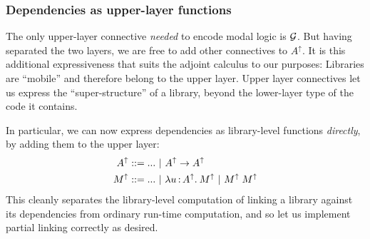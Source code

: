 \documentclass[11pt]{article}
\begin{document}

\subsubsection{Dependencies as upper-layer functions}


The only upper-layer connective \emph{needed} to encode modal logic is $\mathcal{G}$.
But having separated the two layers, we are free to add other connectives to
$A^\uparrow$. It is this additional expressiveness that suits the adjoint
calculus to our purposes: Libraries are ``mobile'' and therefore belong to the
upper layer. Upper layer connectives let us express the ``super-structure'' of a
library, beyond the lower-layer type of the code it contains.

In particular, we can now express dependencies as library-level functions
\emph{directly}, by adding them to the upper layer:
\begin{align*}
  A^\uparrow &::= ... ~|~ A^\uparrow \to A^\uparrow\\
  M^\uparrow &::= ... ~|~ \lambda u \mathop{:} A^\uparrow .\: M^\uparrow ~|~ M^\uparrow \; M^\uparrow
\end{align*}
This cleanly separates the library-level computation of linking a library
against its dependencies from ordinary run-time computation, and so let us
implement partial linking correctly as desired.
\end{document}
